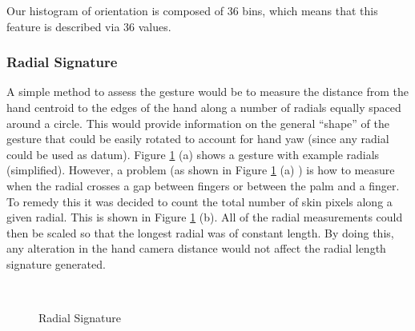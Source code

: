 \documentclass[12pt,fleqn]{book} %
\begin{document}
Our histogram of orientation is composed of 36 bins, which means that this feature is described via 36 values.
\bigskip
\subsubsection{Radial Signature}
A simple method to assess the gesture would be to measure the distance from the hand centroid to the edges of the hand along a number of radials equally spaced around a circle. This would provide information on the general “shape” of the gesture that could be easily rotated to account for hand yaw (since any radial could be used as datum).
\bigskip
Figure \ref{fig:radial_sig} (a) shows a gesture with example radials (simplified).
However, a problem (as shown in Figure \ref{fig:radial_sig} (a) ) is how to measure when the radial crosses a gap between fingers or between the palm and a finger. To remedy this it was decided to count the total number of skin pixels along a given radial. This is shown in Figure \ref{fig:radial_sig} (b). All of the radial measurements could then be scaled so that the longest radial was of constant length. By doing this, any alteration in the hand camera distance would not affect the radial length signature generated.

\begin{figure}[h]
\begin{dBox}
\centering
  \mbox{
   }
   \caption{Radial Signature \label{fig:radial_sig} }   
\end{dBox}   
\end{figure}
\end{document}
